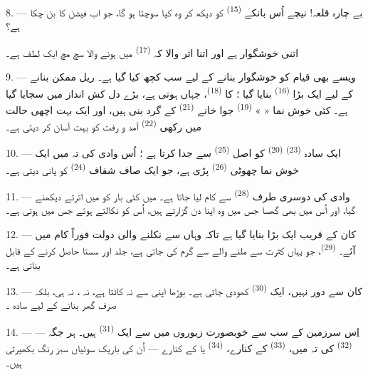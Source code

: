8. --- بے چارہ قلعہ! نیچے اُس بانکے 
\textsuperscript{(15)} کو دیکھ کر وہ کیا سوچتا ہو گا، جو اب فیشن کا
 بن چکا ہے؟

 اتنی خوشگوار ہے اور  اتنا اثر
والا کہ  \textsuperscript{(17)} میں ہونے والا
 سچ مچ ایک لطف ہے۔

\VUsaut{3.0mm}
\VUsaut{3.0mm}

9. --- ویسے بھی قیام کو خوشگوار بنانے کے لیے سب کچھ کیا گیا ہے۔ ریل
ممکن بنانے کے لیے ایک بڑا  \textsuperscript{(16)}
بنایا گیا ؛  کا  \textsuperscript{(18)}،
جہاں  ہوتی ہے، بڑے دل کش انداز میں سجایا گیا
ہے۔ کئی خوش نما «  » \textsuperscript{(19)} جوا
خانے \textsuperscript{(21)} کے گرد بنی ہیں، اور ایک بہت اچھی
حالت میں رکھی  \textsuperscript{(22)} آمد و رفت کو
بہت آسان کر دیتی ہے۔

10. --- ایک سادہ  \textsuperscript{(23)}
 \textsuperscript{(20)} کو اصل 
\textsuperscript{(25)} سے جدا کرتا ہے ؛ اُس وادی کی تہ میں ایک خوش نما
چھوٹی  \textsuperscript{(26)} پڑی ہے، جو ایک صاف شفاف
 \textsuperscript{(24)} کو پانی دیتی ہے۔

11. --- وادی کی دوسری طرف  \textsuperscript{(28)}
سے کام لیا جاتا ہے۔ میں کئی بار  کو  میں اترتے دیکھنے گیا، اور اُس  میں بھی گھسا جس
میں وہ اپنا دن گزارتے ہیں، اُس  کو نکالتے ہوئے جس
میں  ہوتی ہے۔

12. --- کان کے قریب ایک بڑا  بنایا گیا ہے تاکہ
وہاں سے نکلنے والی دولت فوراً کام میں آئے۔ 
\textsuperscript{(29)}، جو یہاں کثرت سے ملنے والے  سے گرم کی جاتی ہے،  جلد اور سستا حاصل کرنے
کے قابل بناتی ہے۔

13. --- کان سے دور نہیں، ایک 
\textsuperscript{(30)} کھودی جاتی ہے۔ بوڑھا  اپنی
 سے نہ  کاٹتا ہے، نہ ،
نہ  ہی، بلکہ صرف گھر بنانے کے لیے سادہ
۔

14. --- اِس سرزمین کے سب سے خوبصورت زیوروں میں سے ایک
 \textsuperscript{(31)} ہیں۔ ہر جگہ — 
\textsuperscript{(32)} کی تہ میں، 
\textsuperscript{(33)} کے کنارے، 
\textsuperscript{(34)} یا  کے کنارے — اُن کی باریک
سوئیاں سبز رنگ بکھیرتی ہیں۔

